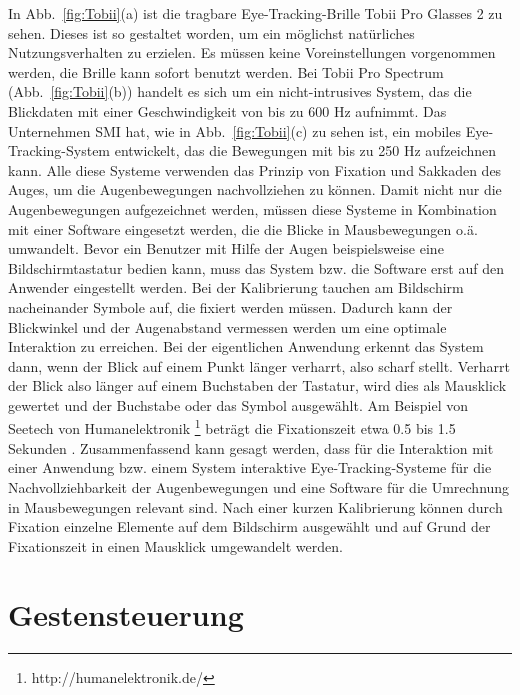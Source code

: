 \newline \newline
In Abb.~\ref{fig:Tobii}(a) ist die tragbare Eye-Tracking-Brille Tobii Pro Glasses 2 zu sehen. Dieses ist so gestaltet worden, um ein möglichst natürliches Nutzungsverhalten zu erzielen. Es müssen keine Voreinstellungen vorgenommen werden, die Brille kann sofort benutzt werden. Bei Tobii Pro Spectrum (Abb.~\ref{fig:Tobii}(b)) handelt es sich um ein nicht-intrusives System, das die Blickdaten mit einer Geschwindigkeit von bis zu 600 Hz aufnimmt. Das Unternehmen SMI hat, wie in Abb.~\ref{fig:Tobii}(c) zu sehen ist, ein mobiles Eye-Tracking-System entwickelt, das die Bewegungen mit bis zu 250 Hz aufzeichnen kann. Alle diese Systeme verwenden das Prinzip von Fixation und Sakkaden des Auges, um die Augenbewegungen nachvollziehen zu können. Damit nicht nur die Augenbewegungen aufgezeichnet werden, müssen diese Systeme in Kombination mit einer Software eingesetzt werden, die die Blicke in Mausbewegungen o.ä. umwandelt.
\newline \newline
Bevor ein Benutzer mit Hilfe der Augen beispielsweise eine Bildschirmtastatur bedien kann, muss das System bzw. die Software erst auf den Anwender eingestellt werden. Bei der Kalibrierung tauchen am Bildschirm nacheinander Symbole auf, die fixiert werden müssen. Dadurch kann der Blickwinkel und der Augenabstand vermessen werden um eine optimale Interaktion zu erreichen. Bei der eigentlichen Anwendung erkennt das System dann, wenn der Blick auf einem Punkt länger verharrt, also scharf stellt. Verharrt der Blick also länger auf einem Buchstaben der Tastatur, wird dies als Mausklick gewertet und der Buchstabe oder das Symbol ausgewählt. Am Beispiel von Seetech von Humanelektronik %
\footnote{http://humanelektronik.de/}
%
beträgt die Fixationszeit etwa 0.5 bis 1.5 Sekunden \cite{SEETECH}.
\newline \newline \newline
Zusammenfassend kann gesagt werden, dass für die Interaktion mit einer Anwendung bzw. einem System interaktive Eye-Tracking-Systeme für die Nachvollziehbarkeit der Augenbewegungen und eine Software für die Umrechnung in Mausbewegungen relevant sind. Nach einer kurzen Kalibrierung können durch Fixation einzelne Elemente auf dem Bildschirm ausgewählt und auf Grund der Fixationszeit in einen Mausklick umgewandelt werden.

\section{Gestensteuerung}

